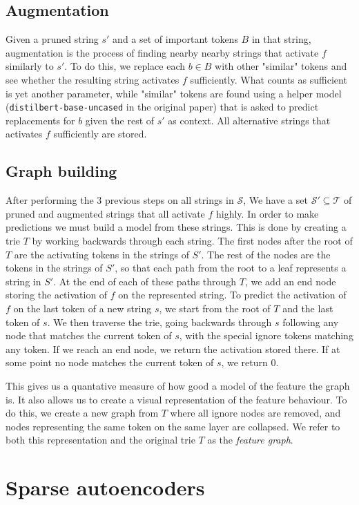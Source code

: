 \subsection{Augmentation}
Given a pruned string $s'$ and a set of important tokens $B$ in that string, 
augmentation is the process of finding nearby nearby strings 
that activate $f$ similarly to $s'$.
To do this, we replace each $b\in B$ with other "similar" tokens and 
see whether the resulting string activates $f$ sufficiently.
What counts as sufficient is yet another parameter, 
while "similar" tokens are found using a helper model 
(\verb|distilbert-base-uncased| in the original paper) 
that is asked to predict replacements for $b$ 
given the rest of $s'$ as context.
All alternative strings that activates $f$ sufficiently are stored.

\subsection{Graph building}
After performing the $3$ previous steps on all strings in $\mathcal S$, 
We have a set $\mathcal S'\subseteq\mathcal T$ 
of pruned and augmented strings that all activate $f$ highly.
In order to make predictions we must build a model from these strings.
This is done by creating a trie $T$ 
by working backwards through each string.
The first nodes after the root of $T$ are the activating tokens 
in the strings of $S'$.
The rest of the nodes are the tokens in the strings of $S'$, 
so that each path from the root to a leaf represents a string in $S'$.
At the end of each of these paths through $T$, 
we add an end node storing the activation of $f$ on the represented string.
To predict the activation of $f$ on the last token of a new string $s$, 
we start from the root of $T$ and the last token of $s$.
We then traverse the trie, going backwards through $s$ 
following any node that matches the current token of $s$, 
with the special ignore tokens matching any token.
If we reach an end node, we return the activation stored there.
If at some point no node matches the current token of $s$, 
we return $0$.

This gives us a quantative measure of how good a model of the feature 
the graph is.
It also allows us to create a visual representation 
of the feature behaviour.
To do this, we create a new graph from $T$ 
where all ignore nodes are removed, 
and nodes representing the same token on the same layer are collapsed.
We refer to both this representation and the original trie $T$ 
as the \emph{feature graph}.

\section{Sparse autoencoders}
